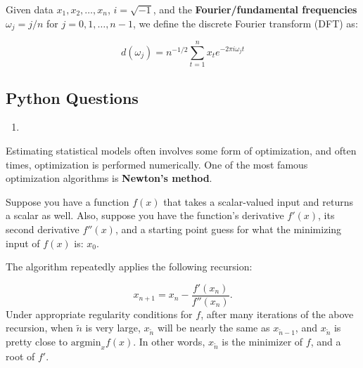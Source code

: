 \documentclass[
  12pt,
  krantz2]{krantz}
\providecommand{\tightlist}{%
  \setlength{\itemsep}{0pt}\setlength{\parskip}{0pt}}
\begin{document}
Given data \(x_1,x_2,\ldots,x_n\), \(i = \sqrt{-1}\), and the \textbf{Fourier/fundamental frequencies} \(\omega_j= j/n\) for \(j=0,1,\ldots,n-1\), we define the discrete Fourier transform (DFT) as:

\begin{equation} \label{eq:DFT}
d(\omega_j)= n^{-1/2} \sum_{t=1}^n x_t e^{-2 \pi i \omega_j t}
\end{equation}

\hypertarget{python-questions-4}{%
\subsection{Python Questions}\label{python-questions-4}}

\begin{enumerate}
\def\labelenumi{\arabic{enumi}.}
\tightlist
\item
\end{enumerate}

Estimating statistical models often involves some form of optimization, and often times, optimization is performed numerically. One of the most famous optimization algorithms is \textbf{Newton's method}.

Suppose you have a function \(f(x)\) that takes a scalar-valued input and returns a scalar as well. Also, suppose you have the function's derivative \(f'(x)\), its second derivative \(f''(x)\), and a starting point guess for what the minimizing input of \(f(x)\) is: \(x_0\).

The algorithm repeatedly applies the following recursion:

\begin{equation} 
x_{n+1} = x_{n} - \frac{f'(x_n)}{f''(x_{n})}.
\end{equation}
Under appropriate regularity conditions for \(f\), after many iterations of the above recursion, when \(\tilde{n}\) is very large, \(x_{\tilde{n}}\) will be nearly the same as \(x_{\tilde{n}-1}\), and \(x_{\tilde{n}}\) is pretty close to \(\text{argmin}_x f(x)\). In other words, \(x_{\tilde{n}}\) is the minimizer of \(f\), and a root of \(f'\).
\end{document}
